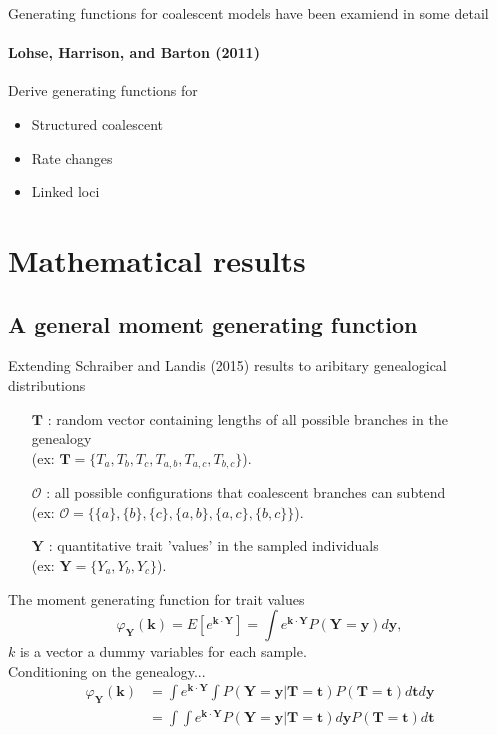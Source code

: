 \documentclass{beamer}
\begin{document}
\begin{frame}{Generating functions for coalescent models have been examiend in some detail}
  \framesubtitle{Lohse, Harrison, and Barton (2011)}
  Derive generating functions for 
  \begin{itemize}
  \item Structured coalescent
  \item Rate changes
  \item Linked loci
  \end{itemize}
\end{frame}

\section{Mathematical results}
\subsection{A general moment generating function}
\begin{frame}{Extending Schraiber and Landis (2015) results to aribitary
    genealogical distributions}
  \begin{itemize}
  \item[$\mathbf{T}$] : random vector containing lengths of all possible
    branches in the genealogy \\(ex:
    $\mathbf{T}=\{T_a,T_b,T_c,T_{a,b},T_{a,c},T_{b,c}\}$).
  \item[$\mathcal{O}$] : all possible configurations that coalescent branches
    can subtend\\ (ex: $\mathcal{O}=\{\{a\},\{b\},\{c\},\{a,b\},\{a,c\},\{b,c\}\}$).
  \item[$\mathbf{Y}$] : quantitative trait 'values' in the sampled individuals\\
    (ex: $\mathbf{Y}=\{Y_a,Y_b,Y_c\}$).
  \end{itemize}
\end{frame}

\begin{frame}{The moment generating function for trait values}
  \begin{equation*}
    \varphi_{\mathbf{Y}}(\mathbf{k}) = E\left[ e^{\mathbf{k} \cdot \mathbf{Y}} \right] =
    \int e^{\mathbf{k} \cdot \mathbf{Y}} P(\mathbf{Y}=\mathbf{y}) d\mathbf{y},
  \end{equation*}
  $k$ is a vector a dummy variables for each sample. \\
  Conditioning on the genealogy...
  \begin{align}
    \varphi_{\mathbf{Y}}(\mathbf{k}) &= \int e^{\mathbf{k} \cdot \mathbf{Y}}
    \int P(\mathbf{Y}=\mathbf{y} | \mathbf{T}=\mathbf{t})
    P(\mathbf{T}=\mathbf{t}) d\mathbf{t} d\mathbf{y}\\ &= \int \int
    e^{\mathbf{k} \cdot \mathbf{Y}} P(\mathbf{Y}=\mathbf{y} |
    \mathbf{T}=\mathbf{t}) d\mathbf{y} P(\mathbf{T}=\mathbf{t}) d\mathbf{t}
  \end{align}
\end{frame}
\end{document}
